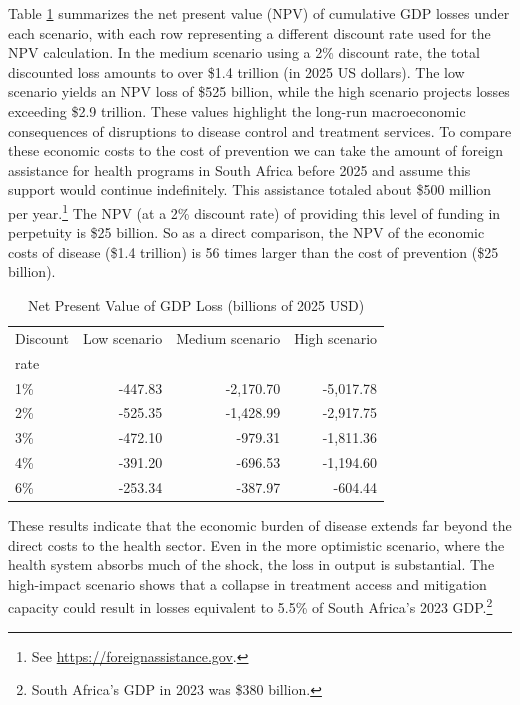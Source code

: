\documentclass[letterpaper,12pt]{article}
\theoremstyle{definition}
\begin{document}
\begin{spacing}{1.5}
Table \ref{tab:NPVLosses} summarizes the net present value (NPV) of cumulative GDP losses under each scenario, with each row representing a different discount rate used for the NPV calculation. In the medium scenario using a 2\% discount rate, the total discounted loss amounts to over \$1.4 trillion (in 2025 US dollars). The low scenario yields an NPV loss of \$525 billion, while the high scenario projects losses exceeding \$2.9 trillion. These values highlight the long-run macroeconomic consequences of disruptions to disease control and treatment services. To compare these economic costs to the cost of prevention we can take the amount of foreign assistance for health programs in South Africa before 2025 and assume this support would continue indefinitely. This assistance totaled about \$500 million per year.\footnote{See \href{https://foreignassistance.gov}{https://foreignassistance.gov}.} The NPV (at a 2\% discount rate) of providing this level of funding in perpetuity is \$25 billion. So as a direct comparison, the NPV of the economic costs of disease (\$1.4 trillion) is 56 times larger than the cost of prevention (\$25 billion).

\begin{table}[H] \centering \captionsetup{width=6.0in}
  \caption{\label{tab:NPVLosses}Net Present Value of GDP Loss (billions of 2025 USD)}
  \begin{tabular}{lrrr}
    \hline\hline
    Discount & Low scenario & Medium scenario & High scenario \\[-1.5mm]
    rate & \citet{Brink2025} & \citet{Gandhi2025} & \citet{KS2025} \\
    \hline\hline
    1\% & -447.83 & -2,170.70 & -5,017.78 \\
    2\% & -525.35 & -1,428.99 & -2,917.75 \\
    3\% & -472.10 & -979.31 & -1,811.36 \\
    4\% & -391.20 & -696.53 & -1,194.60 \\
    6\% & -253.34 & -387.97 & -604.44 \\
    \hline\hline
  \end{tabular}
\end{table}

These results indicate that the economic burden of disease extends far beyond the direct costs to the health sector. Even in the more optimistic scenario, where the health system absorbs much of the shock, the loss in output is substantial. The high-impact scenario shows that a collapse in treatment access and mitigation capacity could result in losses equivalent to 5.5\% of South Africa's 2023 GDP.\footnote{South Africa's GDP in 2023 was \$380 billion.}



\end{spacing}
\end{document}
